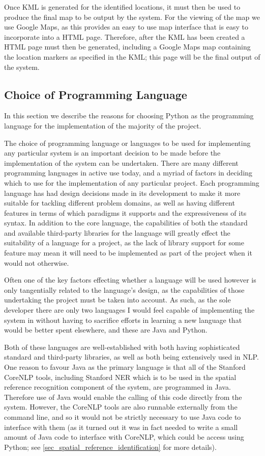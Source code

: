 \documentclass[12pt, a4paper]{report}
\begin{document}
Once KML is generated for the identified locations, it must then be used to produce the final map to be output by the system. For the viewing of the map we use Google Maps, as this provides an easy to use map interface that is easy to incorporate into a HTML page. Therefore, after the KML has been created a HTML page must then be generated, including a Google Maps map containing the location markers as specified in the KML; this page will be the final output of the system.

\subsection{Choice of Programming Language}

In this section we describe the reasons for choosing Python as the programming language for the implementation of the majority of the project.

The choice of programming language or languages to be used for implementing any particular system is an important decision to be made before the implementation of the system can be undertaken. There are many different programming languages in active use today, and a myriad of factors in deciding which to use for the implementation of any particular project. Each programming language has had design decisions made in its development to make it more suitable for tackling different problem domains, as well as having different features in terms of which paradigms it supports and the expressiveness of its syntax. In addition to the core language, the capabilities of both the standard and available third-party libraries for the language will greatly effect the suitability of a language for a project, as the lack of library support for some feature may mean it will need to be implemented as part of the project when it would not otherwise.

Often one of the key factors effecting whether a language will be used however is only tangentially related to the language's design, as the capabilities of those undertaking the project must be taken into account. As such, as the sole developer there are only two languages I would feel capable of implementing the system in without having to sacrifice efforts in learning a new language that would be better spent elsewhere, and these are Java and Python.

Both of these languages are well-established with both having sophisticated standard and third-party libraries, as well as both being extensively used in NLP. One reason to favour Java as the primary language is that all of the Stanford CoreNLP tools, including Stanford NER which is to be used in the spatial reference recognition component of the system, are programmed in Java. Therefore use of Java would enable the calling of this code directly from the system. However, the CoreNLP tools are also runnable externally from the command line, and so it would not be strictly necessary to use Java code to interface with them (as it turned out it was in fact needed to write a small amount of Java code to interface with CoreNLP, which could be access using Python; see \ref{sec_spatial_reference_identification} for more details).
\end{document}

